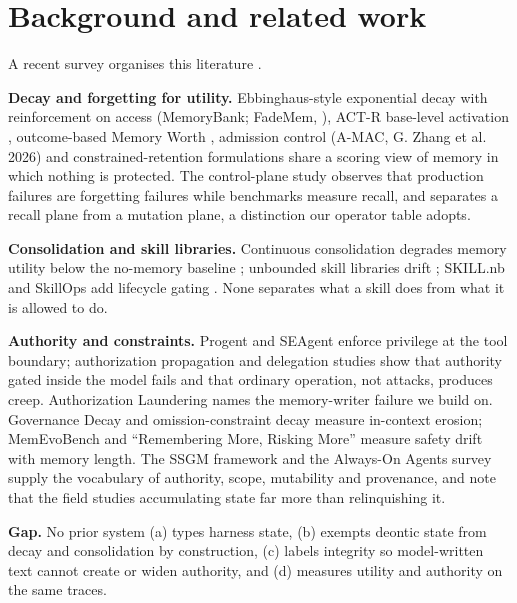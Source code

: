 \section{Background and related work}
\label{sec:background-and-related-work}

A recent survey organises this literature \citep{du2026}.

\textbf{Decay and forgetting for utility.} Ebbinghaus-style exponential decay with reinforcement on access (MemoryBank; FadeMem, \citep{wei2026}), ACT-R base-level activation \citep{anderson1991}, outcome-based Memory Worth \citep{simsek2026}, admission control (A-MAC, G. Zhang et al. 2026) and constrained-retention formulations \citep{kang2026} share a scoring view of memory in which nothing is protected. The control-plane study \citep{yang2026} observes that production failures are forgetting failures while benchmarks measure recall, and separates a recall plane from a mutation plane, a distinction our operator table adopts.

\textbf{Consolidation and skill libraries.} Continuous consolidation degrades memory utility below the no-memory baseline \citep{zhang2026}; unbounded skill libraries drift \citep{zhang2026b}; SKILL.nb and SkillOps add lifecycle gating \citep{hattami2026,pu2026}. None separates what a skill does from what it is allowed to do.

\textbf{Authority and constraints.} Progent \citep{shi2025} and SEAgent \citep{ji2026} enforce privilege at the tool boundary; authorization propagation and delegation studies \citep{tallam2026,dantuluri2026} show that authority gated inside the model fails and that ordinary operation, not attacks, produces creep. Authorization Laundering \citep{cerruti2026} names the memory-writer failure we build on. Governance Decay \citep{chen2026} and omission-constraint decay \citep{gamage2026} measure in-context erosion; MemEvoBench and ``Remembering More, Risking More'' \citep{xie2026,altawaha2026} measure safety drift with memory length. The SSGM framework and the Always-On Agents survey \citep{lam2026,ding2026} supply the vocabulary of authority, scope, mutability and provenance, and note that the field studies accumulating state far more than relinquishing it.

\textbf{Gap.} No prior system (a) types harness state, (b) exempts deontic state from decay and consolidation by construction, (c) labels integrity so model-written text cannot create or widen authority, and (d) measures utility and authority on the same traces.
